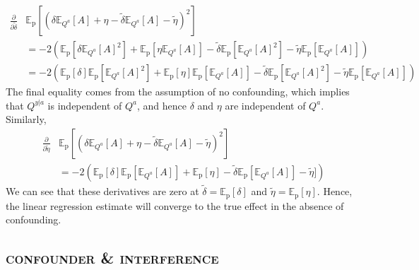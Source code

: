 \documentclass[12pt]{article}
\newcommand{\pr}{\mathrm{p}}
\begin{document}
\begin{equation}
\begin{split}
	\frac{\partial}{\partial \tilde \delta} &  \mathbb{E}_{\pr}[(\delta \mathbb{E}_{Q^a}[A] + \eta - \tilde \delta \mathbb{E}_{Q^a}[A] - \tilde \eta)^2]\\ & = -2\left(\mathbb{E}_{\pr}[\delta \mathbb{E}_{Q^a}[A]^2] + \mathbb{E}_{\pr}[\eta \mathbb{E}_{Q^a}[A]] - \tilde \delta \mathbb{E}_{\pr}[\mathbb{E}_{Q^a}[A]^2] - \tilde \eta \mathbb{E}_{\pr}[\mathbb{E}_{Q^a}[A]] \right)
	\\ & = -2\left(\mathbb{E}_{\pr}[\delta] \mathbb{E}_{\pr}[\mathbb{E}_{Q^a}[A]^2] + \mathbb{E}_{\pr}[\eta]\mathbb{E}_{\pr}[\mathbb{E}_{Q^a}[A]] - \tilde \delta \mathbb{E}_{\pr}[\mathbb{E}_{Q^a}[A]^2] - \tilde \eta \mathbb{E}_{\pr}[\mathbb{E}_{Q^a}[A]] \right)
\end{split}
\end{equation}
The final equality comes from the assumption of no confounding, which implies that $Q^{y|a}$ is independent of $Q^a$, and hence $\delta$ and $\eta$ are independent of $Q^a$.
Similarly,
\begin{equation}
\begin{split}
	\frac{\partial}{\partial \tilde \eta} &  \mathbb{E}_{\pr}[(\delta \mathbb{E}_{Q^a}[A] + \eta - \tilde \delta \mathbb{E}_{Q^a}[A] - \tilde \eta)^2]
	\\ & = -2\left(\mathbb{E}_{\pr}[\delta] \mathbb{E}_{\pr}[\mathbb{E}_{Q^a}[A]] + \mathbb{E}_{\pr}[\eta] - \tilde \delta \mathbb{E}_{\pr}[\mathbb{E}_{Q^a}[A]] - \tilde \eta] \right)
\end{split}
\end{equation}
We can see that these derivatives are zero at $\tilde \delta = \mathbb{E}_{\pr}[\delta]$ and $\tilde \eta = \mathbb{E}_{\pr}[\eta]$.
Hence, the linear regression estimate will converge to the true effect in the absence of confounding.
\fi


\subsection{\textsc{confounder \& interference}} \label{sec:interference_sim}
\end{document}

